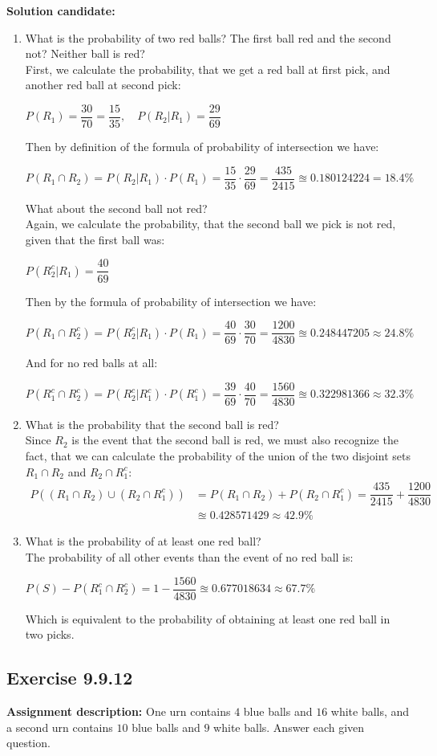 \documentclass{report}
\newcommand{\cent}[1]{\begin{center}#1\end{center}}
\newcommand{\mAlign}[1]{\begin{align*}#1\end{align*}}
\newcommand{\AssignmentDescription}{\textbf{Assignment description: }}
\newcommand{\Solution}{\textbf{Solution candidate: }}
\newcommand{\Exercise}[1]{\subsection{Exercise #1}}
\newcommand{\defaultEnumerateLabel}{\textbf{\alph*.}}
\newcommand{\MyItem}[1]{\item #1\\}
\newcommand{\LetterEnumeration}[1]{\begin{enumerate}[label = \defaultEnumerateLabel]
		#1
\end{enumerate}}
\begin{document}
 	\Solution
 	\LetterEnumeration{
 		\MyItem{What is the probability of two red balls? The first ball red and the second not? Neither ball is red?}
 		
 		First, we calculate the probability, that we get a red ball at first pick, and another red ball at second pick:
 		
 		\cent{$P(R_1) = \dfrac{30}{70} = \dfrac{15}{35}, \quad P(R_2 | R_1) = \dfrac{29}{69}$}
 		
 		Then by definition of the formula of probability of intersection we have:
 		\cent{$P(R_1 \cap R_2) = P(R_2 | R_1) \cdot P(R_1) = \dfrac{15}{35} \cdot \dfrac{29}{69} = \dfrac{435}{2415} \approxeq 0.180124224 = 18.4\%$}
 		
 		What about the second ball not red?\\
 		
 		Again, we calculate the probability, that the second ball we pick is not red, given that the first ball was:
 		
 		\cent{$P(R_2^c | R_1) = \dfrac{40}{69}$}
 		
 		Then by the formula of probability of intersection we have:
 		
 		\cent{$P(R_1 \cap R_2^c) = P(R_2^c | R_1) \cdot P(R_1) = \dfrac{40}{69} \cdot \dfrac{30}{70} = \dfrac{1200}{4830} \approxeq 0.248447205 \approx 24.8\%$}
 		
 		And for no red balls at all:
 		
		\cent{$P(R_1^c \cap R_2^c) = P(R_2^c | R_1^c) \cdot P(R_1^c)= \dfrac{39}{69} \cdot \dfrac{40}{70} = \dfrac{1560}{4830}  \approxeq 0.322981366 \approx 32.3\%$}
		
		\MyItem{What is the probability that the second ball is red?}
		
		Since $R_2$ is the event that the second ball is red, we must also recognize the fact, that we can calculate the probability of the union of the two disjoint sets $R_1 \cap R_2$ and $R_2 \cap R_1^c$:
		\mAlign{
			P((R_1 \cap R_2) \cup (R_2 \cap R_1^c)) &= P(R_1 \cap R_2) + P(R_2 \cap R_1^c) = \dfrac{435}{2415} + 		   \dfrac{1200}{4830} \\
			&\approxeq 0.428571429 \approx 42.9\%
		}
		 
		\MyItem{What is the probability of at least one red ball?}
		
		The probability of all other events than the event of no red ball is:
		
		\cent{$P(S) - P(R_1^c \cap R_2^c)  = 1 - \dfrac{1560}{4830} \approxeq 0.677018634 \approx 67.7\%$}
 		
 		Which is equivalent to the probability of obtaining at least one red ball in two picks.
 	}
 	\Exercise{9.9.12}
 	\AssignmentDescription
 	One urn contains $4$ blue balls and $16$ white balls, and a second urn contains $10$ blue balls and $9$ white balls. Answer each given question.\\
 	
\end{document}
